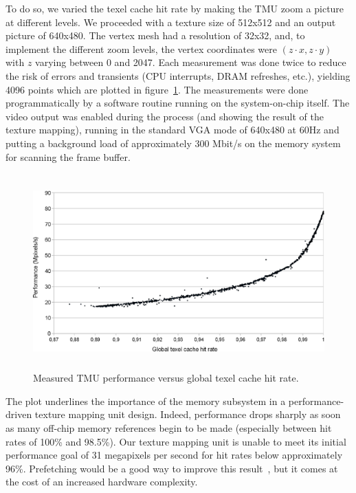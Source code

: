 \documentclass[a4paper,11pt]{kthesis}
\begin{document}
To do so, we varied the texel cache hit rate by making the TMU zoom a picture at different levels. We proceeded with a texture size of 512x512 and an output picture of 640x480. The vertex mesh had a resolution of 32x32, and, to implement the different zoom levels, the vertex coordinates were $(z \cdot x, z \cdot y)$ with $z$ varying between 0 and 2047. Each measurement was done twice to reduce the risk of errors and transients (CPU interrupts, DRAM refreshes, etc.), yielding 4096 points which are plotted in figure~\ref{fig:tmuresult}. The measurements were done programmatically by a software routine running on the system-on-chip itself. The video output was enabled during the process (and showing the result of the texture mapping), running in the standard VGA mode of 640x480 at 60Hz and putting a background load of approximately 300 Mbit/s on the memory system for scanning the frame buffer.

\begin{figure}[htp]
\centering
\includegraphics[height=75mm]{tmuresult.eps}
\caption{Measured TMU performance versus global texel cache hit rate.}
\label{fig:tmuresult}
\end{figure}

The plot underlines the importance of the memory subsystem in a performance-driven texture mapping unit design. Indeed, performance drops sharply as soon as many off-chip memory references begin to be made (especially between hit rates of 100\% and 98.5\%). Our texture mapping unit is unable to meet its initial performance goal of 31 megapixels per second for hit rates below approximately 96\%. Prefetching would be a good way to improve this result~\cite{tmprefetch}, but it comes at the cost of an increased hardware complexity.
\end{document}
